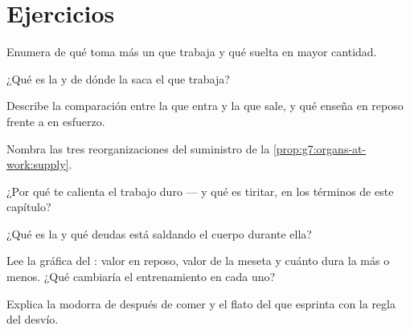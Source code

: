 \section{Ejercicios}

\begin{exercise}[$\star$]\label{exo:g7:organs-at-work:1}
Enumera de qué toma más un  que trabaja y qué suelta en mayor
cantidad.
\end{exercise}

\begin{exercise}[$\star$]\label{exo:g7:organs-at-work:2}
¿Qué es la  y de dónde la saca el  que trabaja?
\end{exercise}

\begin{exercise}[$\star$]\label{exo:g7:organs-at-work:3}
Describe la comparación entre la  que entra y la que sale, y qué
enseña en reposo frente a en esfuerzo.
\end{exercise}

\begin{exercise}[$\star$]\label{exo:g7:organs-at-work:4}
Nombra las tres reorganizaciones del suministro de la
\cref{prop:g7:organs-at-work:supply}.
\end{exercise}

\begin{exercise}[$\star$]\label{exo:g7:organs-at-work:5}
¿Por qué te calienta el trabajo duro --- y qué es tiritar, en los
términos de este capítulo?
\end{exercise}

\begin{exercise}[$\star$]\label{exo:g7:organs-at-work:6}
¿Qué es la  y qué deudas está saldando el cuerpo durante
ella?
\end{exercise}

\begin{exercise}[$\star\star$]\label{exo:g7:organs-at-work:7}
Lee la gráfica del : valor en reposo, valor de la meseta y cuánto
dura la  más o menos. ¿Qué cambiaría el entrenamiento en
cada uno?
\end{exercise}

\begin{exercise}[$\star\star$]\label{exo:g7:organs-at-work:8}
Explica la modorra de después de comer y el flato del que esprinta con
la regla del desvío.
\end{exercise}

